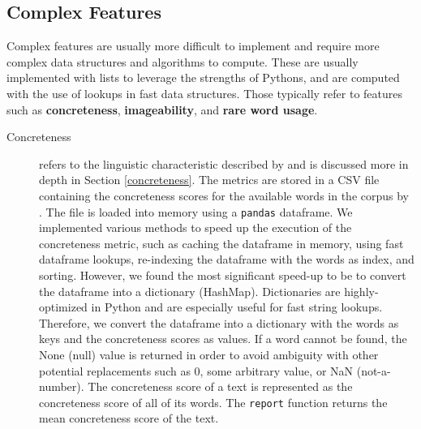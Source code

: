 \subsection{Complex Features}
Complex features are usually more difficult to implement and require more complex data structures and algorithms to compute. These are usually implemented with lists to leverage the strengths of Pythons, and are computed with the use of lookups in fast data structures. Those typically refer to features such as \textbf{concreteness}, \textbf{imageability}, and \textbf{rare word usage}. 

\begin{description}
    \item[Concreteness] refers to the linguistic characteristic described by \cite{brysbaert2014concreteness} and is discussed more in depth in Section \ref{concreteness}. The metrics are stored in a CSV file containing the concreteness scores for the available words in the corpus by \cite{brysbaert2014concreteness}. The file is loaded into memory using a \texttt{pandas} dataframe. We implemented various methods to speed up the execution of the concreteness metric, such as caching the dataframe in memory, using fast dataframe lookups, re-indexing the dataframe with the words as index, and sorting. However, we found the most significant speed-up to be to convert the dataframe into a dictionary (HashMap). Dictionaries are highly-optimized in Python and are especially useful for fast string lookups. Therefore, we convert the dataframe into a dictionary with the words as keys and the concreteness scores as values. If a word cannot be found, the None (null) value is returned in order to avoid ambiguity with other potential replacements such as 0, some arbitrary value, or NaN (not-a-number). The concreteness score of a text is represented as the concreteness score of all of its words. The \texttt{report} function returns the mean concreteness score of the text. 
    

\end{description}
